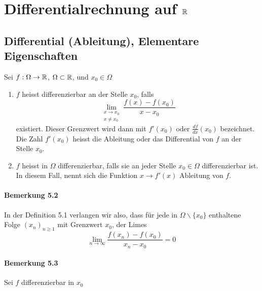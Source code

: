 \chapter{Differentialrechnung auf $\mathbb{R}$}
\section{Differential (Ableitung), Elementare Eigenschaften}
\begin{definition}{5.1}
Sei $f:\Omega\to\mathbb{R}$, $\Omega\subset\mathbb{R}$, und $x_0\in\Omega$
\begin{enumerate}
\item $f$ heisst differenzierbar an der Stelle $x_0$, falls
\[\lim_{\substack{x \to {x_0} \\ x\not  = {x_0}}}{\frac{f\left( x \right) - f\left( {{x_0}} \right)}{{x - {x_0}}}}\]
existiert. Dieser Grenzwert wird dann mit $f'\left( x_0\right)$ oder $\frac{df}{dx}\left( x_0\right)$ bezeichnet. Die Zahl $f'\left( x_0\right)$ heisst die Ableitung oder das Differential von $f$ an der Stelle $x_0$.
\item $f$ heisst in $\Omega$ differenzierbar, falls sie an jeder Stelle $x_0\in\Omega$ differenzierbar ist. In diesem Fall, nennt sich die Funktion $x\to f'(x)$ Ableitung von $f$.
\end{enumerate}
\end{definition}
\subsubsection*{Bemerkung 5.2}
In der Definition 5.1 verlangen wir also, dass für jede in $\Omega \backslash\{ x_0\}$ enthaltene Folge $\left( x_n\right)_{n\geq 1}$ mit Grenzwert $x_0$, der Limes
\[\mathop {\lim }\limits_{n \to \infty} \frac{{f\left( {x_n} \right) - f\left( {{x_0}} \right)}}{{x_n-x_0}} = 0\]
\subsubsection*{Bemerkung 5.3}
Sei $f$ differenzierbar in $x_0$
\begin{center}
\end{center}

